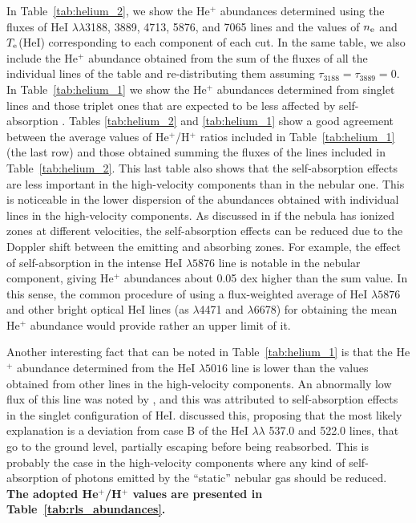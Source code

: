 \documentclass[fleqn,usenatbib]{mnras}
\begin{document}
In Table~\ref{tab:helium_2}, we show the He$^{+}$ abundances determined using the fluxes of He\thinspace I $\lambda \lambda$3188, 3889, 4713, 5876, and 7065 lines and the values of $n_{\rm e}$ and $T_{\rm e}$(He\thinspace I) corresponding to each component of each cut. In the same table, we also include the He$^{+}$ abundance obtained from the sum of the fluxes of all the individual lines of the table and re-distributing them assuming $\tau_{3188} = \tau_{3889}= 0$. 
In Table~\ref{tab:helium_1} we show the He$^{+}$ abundances determined from singlet lines and those triplet ones that are expected to be less affected by self-absorption \citep[see Table 2 from][]{Benjamin02}. Tables \ref{tab:helium_2} and \ref{tab:helium_1} show a good agreement between the average values of He$^{+}$/H$^+$ ratios included in Table~\ref{tab:helium_1} (the last row) and those obtained summing the fluxes of the lines included in Table~\ref{tab:helium_2}. This last table also shows that the self-absorption effects are less important in the high-velocity components than in the nebular one. This is noticeable in the lower dispersion of the abundances obtained with individual lines in the high-velocity components. As discussed in \citet[][see their figure 4.5]{osterbrock06} if the nebula has ionized zones at different velocities, the self-absorption effects can be  reduced due to the Doppler shift between the emitting and absorbing zones. For example, the effect of self-absorption in the intense He\thinspace I  $\lambda 5876$ line is notable in the nebular component,  giving He$^{+}$ abundances about 0.05 dex higher than the sum value. In this sense, the common procedure of using a flux-weighted average of He\thinspace I $\lambda 5876$ and other bright optical He\thinspace I lines (as $\lambda$4471 and $\lambda$6678) for obtaining the mean He$^{+}$ abundance would provide rather an upper limit of it.

Another interesting fact that can be noted in Table~\ref{tab:helium_1} is that the He$^+$ abundance determined from the He\thinspace I $\lambda 5016$ line is lower than the values  obtained from other lines in the high-velocity components. An abnormally low flux of this line was noted by \citet{Esteban04}, and this was attributed to self-absorption effects in the singlet configuration of He\thinspace I. \citet{Porter07} discussed this, proposing that the most likely explanation is a deviation from case B of the He\thinspace I $\lambda \lambda$ 537.0 and 522.0 lines, that go to the ground level, partially escaping before being reabsorbed. This is probably the case in the high-velocity components where any kind of self-absorption of photons emitted by the ``static'' nebular gas should be reduced. {\bf The adopted He$^{+}$/H$^{+}$ values are presented in Table~\ref{tab:rls_abundances}. }
 
\end{document}
